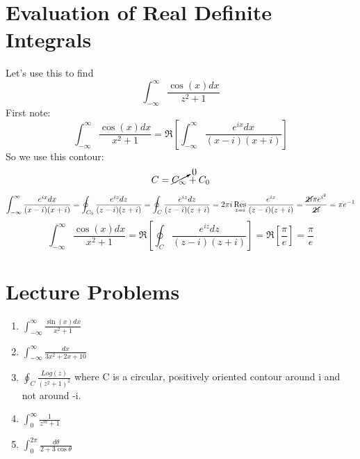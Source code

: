 \documentclass[11pt,notitlepage]{article}
\DeclareMathOperator*{\res}{Res}
\begin{document}
\section{Evaluation of Real Definite Integrals}
Let's use this to find $$\int_{-\infty}^{\infty} \frac{\cos(x)dx}{z^2+1}$$
First note: $$\int_{-\infty}^{\infty} \frac{\cos(x)dx}{x^2+1} = \Re\left[\int_{-\infty}^{\infty} \frac{e^{ix}dx}{(x-i)(x+i)}\right]$$
So we use this contour: $$C = \cancelto0{C_\infty} + C_0$$
$$ \int_{-\infty}^{\infty} \frac{e^{ix}dx}{(x-i)(x+i)} = \oint_{C_0} \frac{e^{iz}dz}{(z-i)(z+i)} = \oint_C \frac{e^{iz}dz}{(z-i)(z+i)} = 2\pi i\res_{z=i}\frac{e^{iz}}{(z-i)(z+i)} = \frac{\cancel{2i}\pi e^{i^2}}{\cancel{2i}}=\pi e^{-1}$$
$$ \int_{-\infty}^{\infty} \frac{\cos(x)dx}{x^2+1} =\Re\left[\oint_C \frac{e^{iz}dz}{(z-i)(z+i)}\right] =\Re\left[\frac\pi e\right] =\frac\pi e$$
\section{Lecture Problems}
\begin{enumerate}
\item $\int_{-\infty}^{\infty} \frac{\sin(x)dx}{x^2+1}$
\item $\int_{-\infty}^{\infty} \frac{dx}{3x^2+2x+10}$
\item $\oint_C \frac{Log(z)}{(z^2+1)^2}$ where C is a circular, positively oriented contour around i and not around -i.
\item $\int_{0}^{\infty} \frac1{z^m+1}$
\item $\int_0^{2\pi}\frac{d\theta}{2+3\cos{\theta}}$
\end{enumerate}
\end{document}
